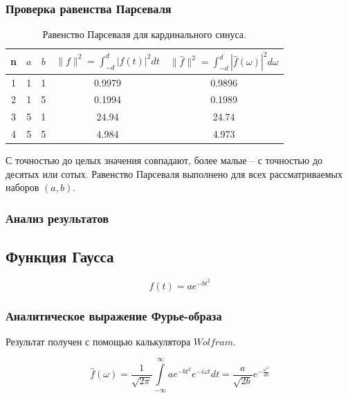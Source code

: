 \documentclass[a5paper, 10pt]{article}
\theoremstyle{definition}
\theoremstyle{plain}
\theoremstyle{remark}
\begin{document}
\subsubsection{Проверка равенства Парсеваля}

\begin{table}[h!]
\caption{Равенство Парсеваля для кардинального синуса.}
\label{tabular:timesandtenses}
\begin{center}
\begin{tabular}{|c|c|c|c|c|}
\hline
n & $a$ & $b$ & $\| f \|^2 = \int_{-d}^d |f(t)|^2 dt $ & $\| \hat{f} \|^2 = \int_{-d}^d |\hat{f}(\omega)|^2 d\omega $ \\
\hline
1 & 1 & 1 &  0.9979& 0.9896\\
\hline
2 & 1 & 5 & 0.1994 &0.1989 \\
\hline
3 & 5 & 1 & 24.94 & 24.74 \\
\hline
4 & 5 & 5 & 4.984 & 4.973 \\
\hline
\end{tabular}
\end{center}
\end{table}

С точностью до целых значения совпадают, более малые -- с точностью до десятых или сотых. Равенство Парсеваля выполнено для всех рассматриваемых наборов $(a, b)$.

\newpage
\subsubsection{Анализ результатов}





\newpage
\subsection{Функция Гаусса}

\begin{equation}
f(t) = a e^{-bt^2}
\end{equation}


\subsubsection{Аналитическое выражение Фурье-образа}

Результат получен с помощью калькулятора $Wolfram$.

\begin{equation}
\hat{f}(\omega) =
 \frac{1}{\sqrt{2 \pi}} \int \limits_{-\infty}^{\infty}  a e^{-bt^2} e^{-i \omega t} dt = \frac{a}{\sqrt{2b}} e^{-\frac{\omega^2}{4b}}
\end{equation}
\end{document}
